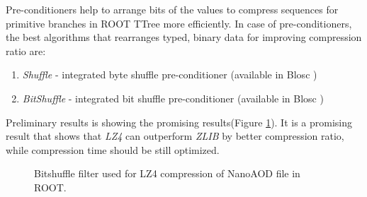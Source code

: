 \documentclass[12pt]{iopart}
\begin{document}
Pre-conditioners help to arrange bits of the values to compress sequences for primitive branches in ROOT TTree more efficiently. In case of pre-conditioners, the best algorithms that rearranges typed, binary data for improving compression ratio are:
\begin{enumerate}
    \item \textit{Shuffle} - integrated byte shuffle pre-conditioner (available in Blosc \cite{blosc})
    \item \textit{BitShuffle} - integrated bit shuffle pre-conditioner (available in Blosc \cite{blosc})
\end{enumerate}

Preliminary results is showing the promising results(Figure \ref{fig:bitshuffle}). It is a promising result that shows that \textit{LZ4} can outperform \textit{ZLIB} by better compression ratio, while compression time should be still optimized.
\begin{figure}
\centering
{}
\caption{Bitshuffle filter used for LZ4 compression of NanoAOD file in ROOT.} \label{fig:bitshuffle}
\end{figure}

\end{document}
